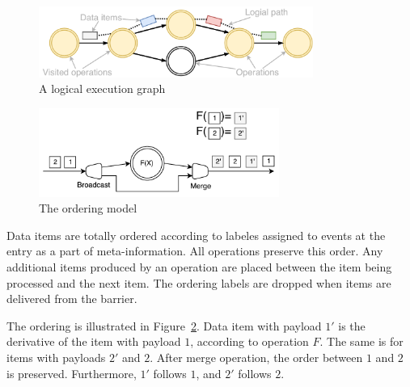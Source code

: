 
\begin{figure}[t]
  \centering
  \includegraphics[width=0.8\textwidth]{Chapters/DeterministicModelRuntime/pics/logical-graph.pdf}
  \caption{A logical execution  graph}
  \label{logical-graph-figure}
\end{figure}

\begin{figure}[t]
  \centering
  \includegraphics[width=0.7\textwidth]{Chapters/DeterministicModelRuntime/pics/ordering}
  \caption{The ordering model}
  \label{ordering}
\end{figure}

Data items are totally ordered according to labeles assigned to events at the entry as a part of meta-information. All operations preserve this order. Any additional items produced by an operation are placed between the item being processed and the next item. The ordering labels are dropped when items are delivered from the barrier. 

The ordering is illustrated  in Figure~\ref{ordering}. Data item with payload $1'$ is the derivative of the item with payload $1$, according to operation $F$. The same is for items with payloads $2'$ and $2$. After merge operation, the order between $1$ and $2$ is preserved. Furthermore, $1'$ follows $1$, and $2'$ follows $2$.  


